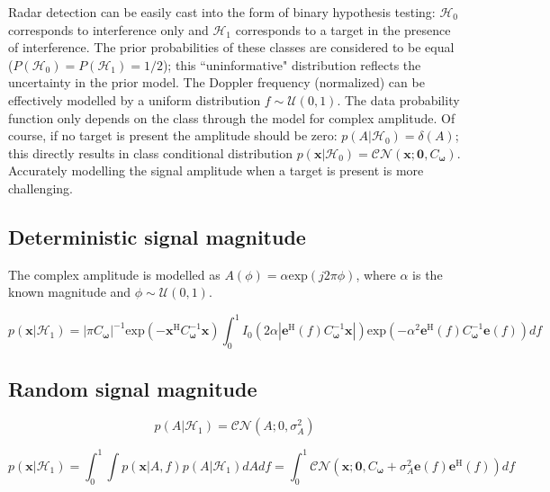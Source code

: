 \documentclass[11pt]{article}
\begin{document}
Radar detection can be easily cast into the form of binary hypothesis testing: $\mathcal{H}_0$ corresponds to interference only and $\mathcal{H}_1$ corresponds to a target in the presence of interference. The prior probabilities of these classes are considered to be equal ($P(\mathcal{H}_0)=P(\mathcal{H}_1)=1/2$); this ``uninformative" distribution reflects the uncertainty in the prior model. The Doppler frequency (normalized) can be effectively modelled by a uniform distribution $f \sim \mathcal{U}(0,1)$. The data probability function only depends on the class through the model for complex amplitude. Of course, if no target is present the amplitude should be zero: $p(A|\mathcal{H}_0) = \delta(A)$; this directly results in class conditional distribution $p(\bm{x}|\mathcal{H}_0) = \mathcal{CN}(\bm{x};\bm{0},C_{\bm{\omega}})$. Accurately modelling the signal amplitude when a target is present is more challenging. 


\subsection{Deterministic signal magnitude}

The complex amplitude is modelled as $A(\phi) = \alpha \text{exp}(j2\pi\phi)$, where $\alpha$ is the known magnitude and $\phi \sim \mathcal{U}(0,1)$.

\begin{equation}
p(\bm{x}|\mathcal{H}_1) = \left|\pi C_{\bm{\omega}} \right|^{-1} \text{exp}\left( -\bm{x}^\text{H} C_{\bm{\omega}}^{-1}\bm{x} \right) \int_0^1 I_\text{0}\left(2\alpha \left|\bm{e}^\text{H}(f) C_{\bm{\omega}}^{-1}\bm{x}\right| \right) \text{exp}\left( -\alpha^2\bm{e}^\text{H}(f) C_{\bm{\omega}}^{-1}\bm{e}(f) \right) df
\end{equation} 

\subsection{Random signal magnitude}

\begin{equation}
p(A|\mathcal{H}_1) =  \mathcal{CN}(A;0,\sigma_A^2)
\end{equation} 

\begin{equation}
p(\bm{x}|\mathcal{H}_1) = \int_0^1 \int p(\bm{x}|A,f) p(A|\mathcal{H}_1) dA df = \int_0^1 \mathcal{CN}(\bm{x};\bm{0},C_{\bm{\omega}}+\sigma_A^2 \bm{e}(f) \bm{e}^\text{H}(f)) df
\end{equation} 
\end{document}
